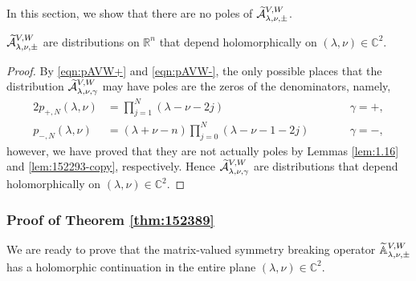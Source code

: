 In this section,
 we show
 that there are no poles of $\widetilde{{\mathcal{A}}}_{{\lambda},{\nu},{\pm}}^{{V,W}}$.  
\begin{lemma}
\label{lem:Aholo}
$\widetilde{{\mathcal{A}}}_{{\lambda},{\nu},{\pm}}^{{V,W}}$ are distributions on ${\mathbb{R}}^n$
 that depend holomorphically on $(\lambda, \nu)\in {\mathbb{C}}^2$.  
\end{lemma}
\begin{proof}
By \eqref{eqn:pAVW+} and \eqref{eqn:pAVW-}, 
 the only possible places that the distribution
 $\widetilde{{\mathcal{A}}}_{{\lambda},{\nu},{\gamma}}^{{V,W}}$ may have poles 
are the zeros of the denominators,
 namely,
\begin{alignat*}{2}
p_{+,N}(\lambda,\nu)
&=\prod_{j=1}^N (\lambda - \nu -2j) \qquad 
&& \gamma =+, 
\\
p_{-,N}(\lambda,\nu)
&=
(\lambda + \nu -n) \prod_{j=0}^N (\lambda - \nu -1-2j) 
\qquad
&& \gamma =-, 
\end{alignat*} 
however,
 we have proved
 that they are not actually poles
 by Lemmas \ref{lem:1.16} and \ref{lem:152293-copy}, 
 respectively.  
Hence $\widetilde{{\mathcal{A}}}_{{\lambda},{\nu},{\gamma}}^{{V,W}}$ are distributions
 that depend holomorphically on $(\lambda,\nu) \in {\mathbb{C}}^2$.  
\end{proof}


\subsubsection{Proof of Theorem \ref{thm:152389}}
\label{subsec:pfAholo}

We are ready to prove
 that the matrix-valued symmetry breaking operator
 ${\widetilde{\mathbb{A}}}_{{\lambda},{\nu},{\pm}}^{{V,W}}$ has a holomorphic continuation
 in the entire plane $(\lambda,\nu) \in {\mathbb{C}}^2$.  
 
